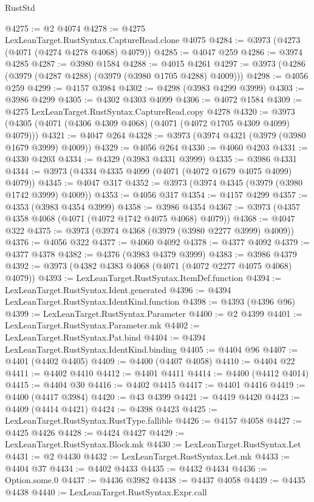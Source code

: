 \begin{lexlean}{RustStd}
\begin{coremodule}
@4275 := @2 @4074
@4278 := @4275 LexLeanTarget.RustSyntax.CaptureRead.clone @4075
@4284 := @3973 (@4273 (@4071 (@4274 @4278 @4068) @4079))
@4285 := @4047 @259
@4286 := @3974 @4285
@4287 := @3980 @1584
@4288 := @4015 @4261
@4297 := @3973 (@4286 (@3979 (@4287 @4288) (@3979 (@3980 @1705 @4288) @4009)))
@4298 := @4056 @259
@4299 := @4157 @3984
@4302 := @4298 (@3983 @4299 @3999)
@4303 := @3986 @4299
@4305 := @4302 @4303 @4099
@4306 := @4072 @1584
@4309 := @4275 LexLeanTarget.RustSyntax.CaptureRead.copy @4278
@4320 := @3973 (@4305 (@4071 (@4306 @4309 @4068) (@4071 (@4072 @1705 @4309 @4099) @4079)))
@4321 := @4047 @264
@4328 := @3973 (@3974 @4321 (@3979 (@3980 @1679 @3999) @4009))
@4329 := @4056 @264
@4330 := @4060 @4203
@4331 := @4330 @4203
@4334 := @4329 (@3983 @4331 @3999)
@4335 := @3986 @4331
@4344 := @3973 (@4334 @4335 @4099 (@4071 (@4072 @1679 @4075 @4099) @4079))
@4345 := @4047 @317
@4352 := @3973 (@3974 @4345 (@3979 (@3980 @1742 @3999) @4009))
@4353 := @4056 @317
@4354 := @4157 @4299
@4357 := @4353 (@3983 @4354 @3999)
@4358 := @3986 @4354
@4367 := @3973 (@4357 @4358 @4068 (@4071 (@4072 @1742 @4075 @4068) @4079))
@4368 := @4047 @322
@4375 := @3973 (@3974 @4368 (@3979 (@3980 @2277 @3999) @4009))
@4376 := @4056 @322
@4377 := @4060 @4092
@4378 := @4377 @4092
@4379 := @4377 @4378
@4382 := @4376 (@3983 @4379 @3999)
@4383 := @3986 @4379
@4392 := @3973 (@4382 @4383 @4068 (@4071 (@4072 @2277 @4075 @4068) @4079))
@4393 := LexLeanTarget.RustSyntax.ItemDef.function
@4394 := LexLeanTarget.RustSyntax.Ident.generated
@4396 := @4394 LexLeanTarget.RustSyntax.IdentKind.function
@4398 := @4393 (@4396 @96)
@4399 := LexLeanTarget.RustSyntax.Parameter
@4400 := @2 @4399
@4401 := LexLeanTarget.RustSyntax.Parameter.mk
@4402 := LexLeanTarget.RustSyntax.Pat.bind
@4404 := @4394 LexLeanTarget.RustSyntax.IdentKind.binding
@4405 := @4404 @96
@4407 := @4401 (@4402 @4405)
@4409 := @4400 (@4407 @4058)
@4410 := @4404 @22
@4411 := @4402 @4410
@4412 := @4401 @4411
@4414 := @4400 (@4412 @4014)
@4415 := @4404 @30
@4416 := @4402 @4415
@4417 := @4401 @4416
@4419 := @4400 (@4417 @3984)
@4420 := @43 @4399
@4421 := @4419 @4420
@4423 := @4409 (@4414 @4421)
@4424 := @4398 @4423
@4425 := LexLeanTarget.RustSyntax.RustType.fallible
@4426 := @4157 @4058
@4427 := @4425 @4426
@4428 := @4424 @4427
@4429 := LexLeanTarget.RustSyntax.Block.mk
@4430 := LexLeanTarget.RustSyntax.Let
@4431 := @2 @4430
@4432 := LexLeanTarget.RustSyntax.Let.mk
@4433 := @4404 @37
@4434 := @4402 @4433
@4435 := @4432 @4434
@4436 := Option.some.{0}
@4437 := @4436 @3982
@4438 := @4437 @4058
@4439 := @4435 @4438
@4440 := LexLeanTarget.RustSyntax.Expr.call

\end{coremodule}
\end{lexlean}

